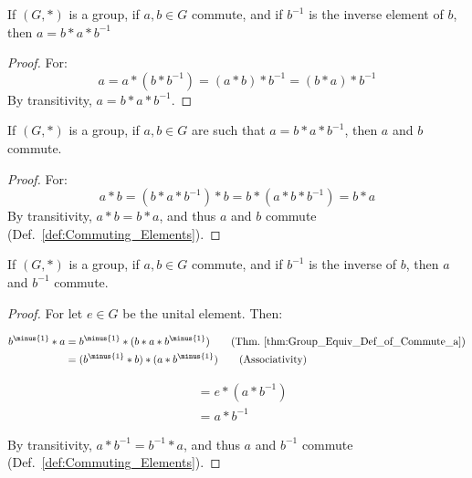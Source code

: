     \begin{theorem}
        \label{thm:Group_Equiv_Def_of_Commute_a}%
        If $(G,*)$ is a group, if $a,b\in{G}$ commute, and if $b^{\minus{1}}$
        is the inverse element of $b$, then $a=b*a*b^{\minus{1}}$
    \end{theorem}
    \begin{proof}
        For:
        \begin{equation}
            a=a*(b*b^{\minus{1}})
            =(a*b)*b^{\minus{1}}
            =(b*a)*b^{\minus{1}}
        \end{equation}
        By transitivity, $a=b*a*b^{\minus{1}}$.
    \end{proof}
    \begin{theorem}
        \label{thm:Group_Equiv_Def_of_Commute_b}%
        If $(G,*)$ is a group, if $a,b\in{G}$ are such that
        $a=b*a*b^{\minus{1}}$, then $a$ and $b$ commute.
    \end{theorem}
    \begin{proof}
        For:
        \begin{equation}
            a*b=(b*a*b^{\minus{1}})*b
            =b*(a*b*b^{\minus{1}})
            =b*a
        \end{equation}
        By transitivity, $a*b=b*a$, and thus $a$ and $b$ commute
        (Def.~\ref{def:Commuting_Elements}).
    \end{proof}
    \begin{theorem}
        \label{thm:Group_Commuting_Elements_Commute_with_Inverses}%
        If $(G,*)$ is a group, if $a,b\in{G}$ commute, and if $b^{\minus{1}}$ is
        the inverse of $b$, then $a$ and $b^{\minus{1}}$ commute.
    \end{theorem}
    \begin{proof}
        For let $e\in{G}$ be the unital element. Then:
        \par
        \begin{minipage}[t]{0.56\textwidth}
            \centering
            \begin{align}
                b^{\minus{1}}*a
                &=b^{\minus{1}}*(b*a*b^{\minus{1}})
                \tag{Thm.~\ref{thm:Group_Equiv_Def_of_Commute_a}}\\
                &=(b^{\minus{1}}*b)*(a*b^{\minus{1}})
                \tag{Associativity}
            \end{align}
        \end{minipage}
        \hfill
        \begin{minipage}[t]{0.42\textwidth}
            \centering
            \begin{align}
                &=e*(a*b^{\minus{1}})
                \tag{Inverse}\\
                &=a*b^{\minus{1}}
                \tag{Identity}
            \end{align}
        \end{minipage}
        \par\vspace{2.5ex}
        By transitivity, $a*b^{\minus{1}}=b^{\minus{1}}*a$, and thus $a$ and
        $b^{\minus{1}}$ commute (Def.~\ref{def:Commuting_Elements}).
    \end{proof}
